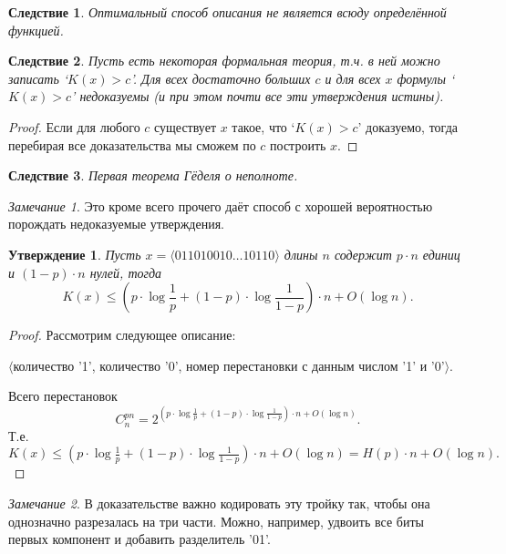 \documentclass[12pt]{article}
\theoremstyle{definition}
\theoremstyle{plain}
\newtheorem{statement}{Утверждение}[section]
\newtheorem{corollary}{Следствие}[section]
\theoremstyle{remark}
\newtheorem{remark}{Замечание}[section]
\begin{document}
\begin{corollary}
    Оптимальный способ описания не является всюду определённой функцией.
\end{corollary}
\begin{corollary}
    Пусть есть некоторая формальная теория, т.ч. в ней можно записать
    `$K(x)>c$'. Для всех достаточно больших $c$ и для всех $x$ формулы
    `$K(x)>c$' недоказуемы (и при этом почти все эти утверждения истины).
\end{corollary}
\begin{proof}
    Если для любого $c$ существует $x$ такое, что `$K(x)>c$' доказуемо,
    тогда перебирая все доказательства мы сможем по $c$ построить $x$.
\end{proof}
\begin{corollary}
    Первая теорема Гёделя о неполноте.
\end{corollary}
\begin{remark}
    Это кроме всего прочего даёт способ с хорошей вероятностью порождать недоказуемые
    утверждения.
\end{remark}

\begin{statement}\label{st:kologorov:entropy}
Пусть $x = \langle{011010010\dotso 10110}\rangle$ длины $n$ содержит
$p\cdot n$ единиц и $(1-p)\cdot n$ нулей, тогда 
\[
    K(x)\le \left(p\cdot\log\frac1p + (1-p)\cdot\log\frac{1}{1-p}\right)\cdot n
        + O(\log n).
\]
\end{statement}
\begin{proof}
    Рассмотрим следующее описание:
    \begin{center}
    $\langle$количество '1', количество '0', номер перестановки с данным числом '1' и '0'$\rangle$.
    \end{center}
Всего перестановок 
    \[
        C_{n}^{pn} = 2^{\left(p\cdot\log\frac1p +
        (1-p)\cdot\log\frac{1}{1-p}\right)\cdot n + O(\log n)}.
    \]
    Т.е. $K(x)\le \left(p\cdot\log\frac1p +
        (1-p)\cdot\log\frac{1}{1-p}\right)\cdot n + O(\log n) = H(p)\cdot n + O(\log n).$
\end{proof}
\begin{remark}
    В доказательстве важно кодировать эту тройку так, чтобы она однозначно
    разрезалась на три части. Можно, например, удвоить все биты первых
    компонент и добавить разделитель '01'.
\end{remark}
\end{document}
